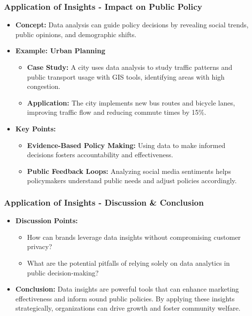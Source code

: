 \documentclass{beamer}
\begin{document}
\begin{frame}[fragile]
    \frametitle{Application of Insights - Impact on Public Policy}
    \begin{itemize}
        \item \textbf{Concept:} Data analysis can guide policy decisions by revealing social trends, public opinions, and demographic shifts.
        
        \item \textbf{Example: Urban Planning}
            \begin{itemize}
                \item \textbf{Case Study:} A city uses data analysis to study traffic patterns and public transport usage with GIS tools, identifying areas with high congestion.
                \item \textbf{Application:} The city implements new bus routes and bicycle lanes, improving traffic flow and reducing commute times by 15\%.
            \end{itemize}

        \item \textbf{Key Points:}
            \begin{itemize}
                \item \textbf{Evidence-Based Policy Making:} Using data to make informed decisions fosters accountability and effectiveness.
                \item \textbf{Public Feedback Loops:} Analyzing social media sentiments helps policymakers understand public needs and adjust policies accordingly.
            \end{itemize}
    \end{itemize}
\end{frame}

\begin{frame}[fragile]
    \frametitle{Application of Insights - Discussion & Conclusion}
    \begin{itemize}
        \item \textbf{Discussion Points:}
            \begin{itemize}
                \item How can brands leverage data insights without compromising customer privacy?
                \item What are the potential pitfalls of relying solely on data analytics in public decision-making?
            \end{itemize}
        
        \item \textbf{Conclusion:}
            Data insights are powerful tools that can enhance marketing effectiveness and inform sound public policies. By applying these insights strategically, organizations can drive growth and foster community welfare.
    \end{itemize}
\end{frame}
\end{document}
